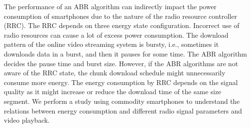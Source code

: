 The performance of an ABR algorithm can indirectly impact the power consumption of smartphones due to the nature of the radio resource controller (RRC). The RRC depends on three energy state configuration. Incorrect use of radio resources can cause a lot of excess power consumption. The download pattern of the online video streaming system is bursty, i.e., sometimes it downloads data in a burst, and then it pauses for some time. The ABR algorithm decides the pause time and burst size. However, if the ABR algorithms are not aware of the RRC state, the chunk download schedule might unnecessarily consume more energy. The energy consumption by RRC depends on the signal quality as it might increase or reduce the download time of the same size segment. We perform a study using commodity smartphones to understand the relations between energy consumption and different radio signal parameters and video playback. 

